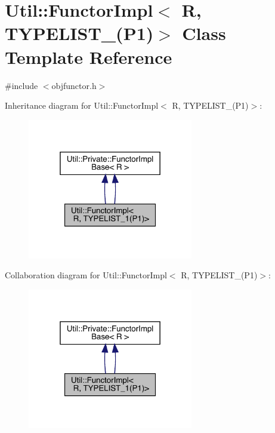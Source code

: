 \hypertarget{classUtil_1_1FunctorImpl_3_01R_00_01TYPELIST__1_07P1_08_4}{}\section{Util\+:\+:Functor\+Impl$<$ R, T\+Y\+P\+E\+L\+I\+S\+T\+\_(P1)$>$ Class Template Reference}
\label{classUtil_1_1FunctorImpl_3_01R_00_01TYPELIST__1_07P1_08_4}


{\ttfamily \#include $<$objfunctor.\+h$>$}



Inheritance diagram for Util\+:\+:Functor\+Impl$<$ R, T\+Y\+P\+E\+L\+I\+S\+T\+\_(P1)$>$\+:\nopagebreak
\begin{figure}[H]
\begin{center}
\leavevmode
\includegraphics[width=205pt]{d4/d52/classUtil_1_1FunctorImpl_3_01R_00_01TYPELIST__1_07P1_08_4__inherit__graph}
\end{center}
\end{figure}


Collaboration diagram for Util\+:\+:Functor\+Impl$<$ R, T\+Y\+P\+E\+L\+I\+S\+T\+\_(P1)$>$\+:\nopagebreak
\begin{figure}[H]
\begin{center}
\leavevmode
\includegraphics[width=205pt]{d0/d4a/classUtil_1_1FunctorImpl_3_01R_00_01TYPELIST__1_07P1_08_4__coll__graph}
\end{center}
\end{figure}
